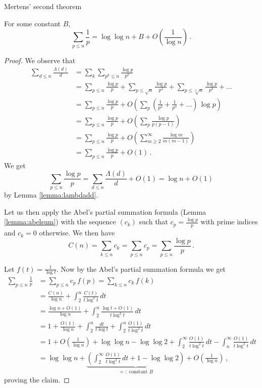 \documentclass{article}
\begin{document}
\begin{theorem}
Mertens' second theorem
\label{thm:mertens32}

For some constant $B$,
\begin{equation*}
    \sum_{p\leq n}\frac{1}{p} = \log\log n + B + O\left(\frac{1}{\log n}\right)\,.
\end{equation*}

\begin{proof}
We observe that
\begin{align*}
    \sum_{d\leq n} \frac{\Lambda(d)}{d} & = \sum_k \sum_{p^k\leq n} \frac{\log p}{p^k}\\
    & = \sum_{p\leq n} \frac{\log p}{p} + \sum_{p\leq \sqrt{n}} \frac{\log p}{p^2} + \sum_{p\leq \sqrt[3]{n}} \frac{\log p}{p^3} + \dots\\
    & = \sum_{p\leq n} \frac{\log p}{p} + O\left(\sum_p \left(\frac{1}{p^2}+\frac{1}{p^3}+\dots\right)\,\log p\right)\\
    & = \sum_{p\leq n} \frac{\log p}{p} + O\left(\sum_p \frac{\log p}{p(p-1)}\right)\\
    & = \sum_{p\leq n} \frac{\log p}{p} + O\left(\sum_{m\geq2}^\infty \frac{\log m}{m(m-1)}\right)\\
    & = \sum_{p\leq n} \frac{\log p}{p} + O(1)\,.
\end{align*}
We get
\begin{equation*}
    \sum_{p\leq n} \frac{\log p}{p} = \sum_{d\leq n} \frac{\Lambda(d)}{d} + O(1) = \log n + O(1)
\end{equation*}
by Lemma \ref{lemma:lambdadd}.

Let us then apply the Abel's partial summation formula (Lemma \ref{lemma:abelsum}) with the sequence $(c_k)$ such that $c_p=\frac{\log p}{p}$ with prime indices and $c_k=0$ otherwise. We then have
\begin{equation*}
    C(n) = \sum_{k\leq n} c_k = \sum_{p\leq n} c_p = \sum_{p\leq n} \frac{\log p}{p}\,.
\end{equation*}

Let $f(t)=\frac{1}{\log t}$. Now by the Abel's partial summation formula we get
\begin{align*}
    \sum_{p\leq n} \frac{1}{p} & = \sum_{p\leq n} c_p\,f(p) = \sum_{k\leq n} c_k\,f(k)\\
    & = \frac{C(n)}{\log n} + \int_2^n \frac{C(t)}{t\log^2 t}\,dt\\
    & = \frac{\log n + O(1)}{\log n} + \int_2^n \frac{\log t + O(1)}{t\log^2 t}\,dt\\
    & = 1 + \frac{O(1)}{\log n} + \int_2^n \frac{dt}{t \log t} + \int_2^n \frac{O(1)}{t \log^2 t}\,dt\\
    & = 1 + O\left(\frac{1}{\log n}\right) + \log\log n - \log\log 2 + \int_2^\infty \frac{O(1)}{t \log^2 t}\,dt - \int_n^\infty \frac{O(1)}{t \log^2 t}\,dt\\
    & = \log\log n + \underbrace{\left(\int_2^\infty \frac{O(1)}{t \log^2 t}\,dt + 1 - \log \log 2\right)}_\text{$=:$ constant $B$} + O\left(\frac{1}{\log n}\right)\,,
\end{align*}
proving the claim.


\end{proof}
\end{theorem}
\end{document}
